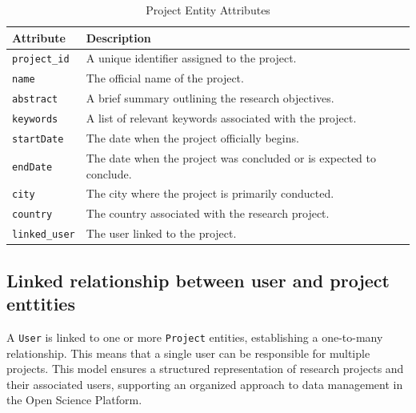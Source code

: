 \documentclass{article}
\begin{document}
\begin{table}[h]
      \centering
      \renewcommand{\arraystretch}{1.2}
      \caption{Project Entity Attributes}
      \label{tab:project_entity}
      \begin{tabularx}{\textwidth}{|l|X|}
            \hline
            \textbf{Attribute}    & \textbf{Description}                                                \\ \hline
            \texttt{project\_id}  & A unique identifier assigned to the project.                        \\ \hline
            \texttt{name}         & The official name of the project.                                   \\ \hline
            \texttt{abstract}     & A brief summary outlining the research objectives.                  \\ \hline
            \texttt{keywords}     & A list of relevant keywords associated with the project.            \\ \hline
            \texttt{startDate}    & The date when the project officially begins.                        \\ \hline
            \texttt{endDate}      & The date when the project was concluded or is expected to conclude. \\ \hline
            \texttt{city}         & The city where the project is primarily conducted.                  \\ \hline
            \texttt{country}      & The country associated with the research project.                   \\ \hline
            \texttt{linked\_user} & The user linked to the project.                                     \\ \hline
      \end{tabularx}
\end{table}


\subsection{Linked relationship between user and project enttities}
A \texttt{User} is linked to one or more \texttt{Project} entities, establishing a one-to-many relationship. This means that a single user can be responsible for multiple projects. This model ensures a structured representation of research projects and their associated users, supporting an organized approach to data management in the Open Science Platform.
\end{document}
